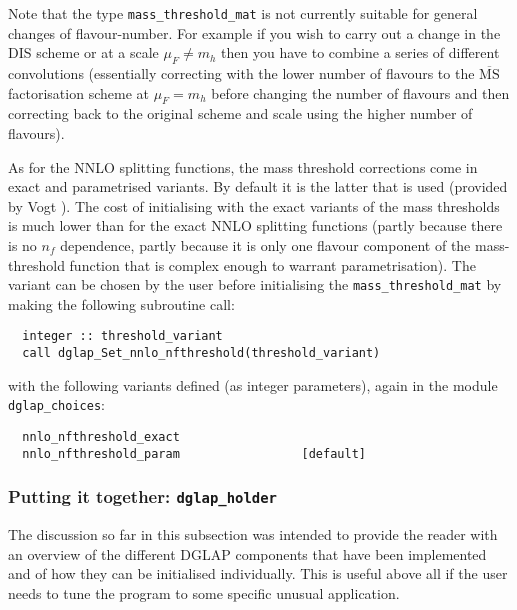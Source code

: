 \documentclass[12pt]{article}
\newcommand{\MSbar}{\overline{\mathrm{MS}}}
\newcommand{\ttt}[1]{\texttt{#1}}
\begin{document}
Note that the type {\tt mass\_threshold\_mat}
is not currently suitable for general changes of
flavour-number. For example if you wish to carry out a change in the
DIS scheme or at a scale $\mu_F \neq m_h$ then you have
to combine a series of different convolutions (essentially correcting
with the lower number of flavours to the $\MSbar$ factorisation scheme
at $\mu_F = m_h$ before changing the number of flavours
and then correcting back to the original scheme and scale using the
higher number of flavours).


As for the NNLO splitting functions, the mass threshold corrections
come in exact and parametrised variants. By default it is the latter
that is used (provided by Vogt \cite{VogtMTMParam}).  The cost of
initialising with the exact variants of the mass thresholds is much
lower than for the exact NNLO splitting functions (partly because
there is no $n_f$ dependence, partly because it is only one flavour
component of the mass-threshold function that is complex enough to
warrant parametrisation). The variant can be chosen by the user
before initialising the \ttt{mass\_threshold\_mat} by making the
following subroutine call:
\begin{lstlisting}
  integer :: threshold_variant
  call dglap_Set_nnlo_nfthreshold(threshold_variant)
\end{lstlisting}
with the following variants defined (as integer parameters), again in
the module \ttt{dglap\_choices}:
\begin{lstlisting}
  nnlo_nfthreshold_exact
  nnlo_nfthreshold_param                 [default]
\end{lstlisting}


\subsubsection{Putting it together: \ttt{dglap\_holder}}

The discussion so far in this subsection was intended to provide the
reader with an overview of the different DGLAP components that have
been implemented and of how they can be initialised individually. This
is useful above all if the user needs to tune the program to some
specific unusual application.
\end{document}
